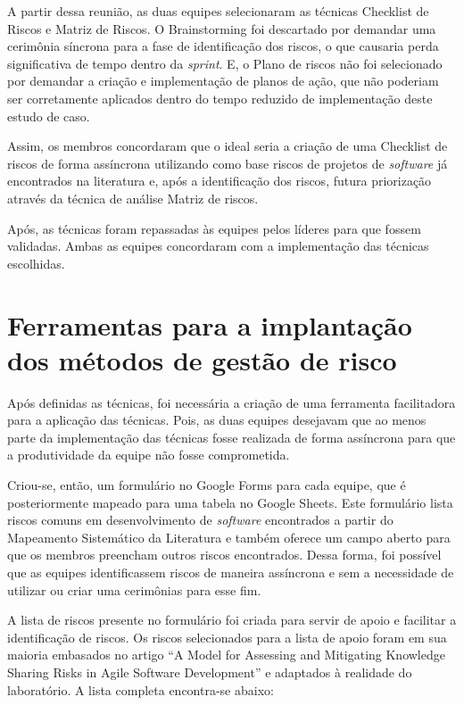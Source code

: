 \documentclass[
    12pt,       %
    openright,      %
    twoside,      %
    a4paper,      %
    english,      %
    french,       %
    spanish,      %
    brazil,       %
    ]{abntex2}
\begin{document}
A partir dessa reunião, as duas equipes selecionaram as técnicas Checklist de Riscos e Matriz de Riscos. O Brainstorming foi descartado por demandar uma cerimônia síncrona para a fase de identificação dos riscos, o que causaria perda significativa de tempo dentro da \textit{sprint}. E, o Plano de riscos não foi selecionado por demandar a criação e implementação de planos de ação, que não poderiam ser corretamente aplicados dentro do tempo reduzido de implementação deste estudo de caso. 

Assim, os membros concordaram que o ideal seria a criação de uma Checklist de riscos de forma assíncrona utilizando como base riscos de projetos de \textit{software} já encontrados na literatura e, após a identificação dos riscos, futura priorização através da técnica de análise Matriz de riscos.

Após, as técnicas foram repassadas às equipes pelos líderes para que fossem validadas. Ambas as equipes concordaram com a implementação das técnicas escolhidas.

\section{Ferramentas para a implantação dos métodos de gestão de risco}

Após definidas as técnicas, foi necessária a criação de uma ferramenta facilitadora para a aplicação das técnicas. Pois, as duas equipes desejavam que ao menos parte da implementação das técnicas fosse realizada de forma assíncrona para que a produtividade da equipe não fosse comprometida.

Criou-se, então, um formulário no Google Forms para cada equipe, que é posteriormente mapeado para uma tabela no Google Sheets. Este formulário lista riscos comuns em desenvolvimento de \textit{software} encontrados a partir do Mapeamento Sistemático da Literatura e também oferece um campo aberto para que os membros preencham outros riscos encontrados. Dessa forma, foi possível que as equipes identificassem riscos de maneira assíncrona e sem a necessidade de utilizar ou criar uma cerimônias para esse fim. 

A lista de riscos presente no formulário foi criada para servir de apoio e facilitar a identificação de riscos. Os riscos selecionados para a lista de apoio foram em sua maioria embasados no artigo ``A Model for Assessing and Mitigating  Knowledge Sharing Risks in Agile Software Development'' \cite{Ghobadi:2017} e adaptados à realidade do laboratório. A lista completa encontra-se abaixo:
\end{document}
